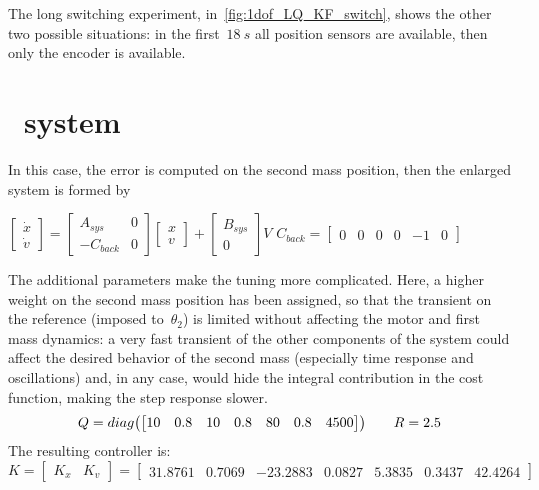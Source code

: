 The long switching experiment, in~\cref{fig:1dof_LQ_KF_switch}, shows the other two possible situations: in the first~$18\ s$ all position sensors are available, then only the encoder is available.

\section{\twodof\ system}

In this case, the error is computed on the second mass position, then the enlarged system is formed by
\begin{center}
	$\begin{bmatrix}
		\dot{x} \\
		\dot{v}
	\end{bmatrix}
	=
	\begin{bmatrix}
		A_{sys} & 0 \\
		-C_{back} & 0
	\end{bmatrix}
	\begin{bmatrix}
		x \\
		v
	\end{bmatrix}
	+
	\begin{bmatrix}
		B_{sys} \\
		0
	\end{bmatrix}
	V$		\qquad $ C_{back} =
	\begin{bmatrix}
		0 & 0 & 0 & 0 & -1 & 0
	\end{bmatrix}$
\end{center}

The additional parameters make the tuning more complicated. Here, a higher weight on the second mass position has been assigned, so that the transient on the reference (imposed to~$\theta_2$) is limited without affecting the motor and first mass dynamics: a very fast transient of the other components of the system could affect the desired behavior of the second mass (especially time response and oscillations) and, in any case, would hide the integral contribution in the cost function, making the step response slower.
\[
	Q = diag
	\bigl{(}
	\begin{bmatrix}
		10 & 0.8 & 10 & 0.8 & 80 & 0.8 & 4500
	\end{bmatrix}
	\bigr{)}
	\qquad
	R = 2.5
\]
The resulting controller is:
\begin{equation}
	K =
	\left[
	\begin{array}{c|c}
		K_x & K_v
	\end{array}
	\right]
	=
	\left[
	\begin{array}{cccccc|c}
		31.8761 & 0.7069 & -23.2883 & 0.0827 & 5.3835 & 0.3437 & 42.4264
	\end{array}
	\right]
	\label{eq:2dof_LQ_fastK}
\end{equation}

